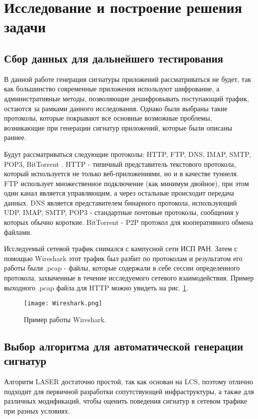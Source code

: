 \section{Исследование и построение решения задачи}
\label{sec:Section3} 

\subsection{Сбор данных для дальнейшего тестирования}

В данной работе генерация сигнатуры приложений рассматриваться не будет,
так как большинство современные приложения используют шифрование, а административные методы,
позволяющие дешифровывать поступающий трафик, остаются за рамками данного исследования.
Однако были выбраны такие протоколы, которые покрывают все основные возможные проблемы,
возникающие при генерации сигнатур приложений, которые были описаны раннее.

Будут рассматриваться следующие протоколы: HTTP, FTP, DNS, IMAP, SMTP, POP3, BitTorrent \cite{Bittorent}.
HTTP - типичный представитель текстового протокола, который используется не только веб-приложениями,
но и в качестве туннеля.
FTP использует множественное подключение (как минимум двойное), при этом один канал является управляющим,
а через остальные происходит передача данных. DNS является представителем бинарного протокола, использующий UDP.
IMAP, SMTP, POP3 - стандартные почтовые протоколы, сообщения у которых обычно короткие.
BitTorrent - P2P протокол для кооперативного обмена файлами.

Исследуемый сетевой трафик снимался с кампусной сети ИСП РАН. Затем с помощью Wireshark \cite{Wireshark}
этот трафик был разбит по протоколам и результатом его работы были .pcap - файлы,
которые содержали в себе сессии определенного протокола, захваченные в течение исследуемого сетевого взаимодействия.
Пример выходного .pcap файла для HTTP можно увидеть на рис. \ref{wireshark}.

\begin{figure}[H]
    \begin{center}
        \texttt{[image: Wireshark.png]}
        \caption{Пример работы Wireshark.}\label{wireshark}
    \end{center}
\end{figure}

\subsection{Выбор алгоритма для автоматической генерации сигнатур}
Алгоритм LASER достаточно простой, так как основан на LCS, поэтому отлично подходит для первичной разработки сопутствующей инфраструктуры,
а также для различных модификаций, чтобы оценить поведения сигнатур в сетевом трафике при разных условиях.


